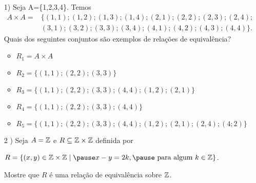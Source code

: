 \documentclass{beamer}
\begin{document}
    \begin{frame}
        \begin{exemplos}
            \begin{itemize}
                \item[1)] Seja A=\{1,2,3,4\}. Temos
                \begin{align*}
                    A\times A = &\{(1,1);(1,2);(1,3);(1,4);(2,1);(2,2);(2,3);(2,4);\\ &(3,1);(3,2);(3,3);(3,4);(4,1);(4,2);(4,3);(4,4)\}.
                \end{align*}
                Quais dos seguintes conjuntos s\~ao exemplos de rela{\c c}{\~o}es de equival{\^e}ncia?
                \begin{itemize}
                    \item $R_{1}= A\times A$\pause
                    \item $R_{2}=\{(1,1);(2,2);(3,3)\}$\pause
                    \item $R_{3}=\{(1,1);(2,2);(3,3);(4,4);(1,2);(2,1)\}$\pause
                    \item $R_{4}=\{(1,1);(2,2);(3,3);(4,4)\}$\pause
                    \item $R_{5}=\{(1,1);(2,2);(3,3);(4,4);(1,2);(2,1);(2,4);(4;2)\}$\pause
                \end{itemize}
            \end{itemize}
        \end{exemplos}
    \end{frame}
    \begin{frame}
    \end{frame}
    \begin{frame}
        \begin{exemplos}
            \begin{itemize}[label={\arabic*})]                
                \item[2
                )] Seja $A = \mathbb{Z}$ \pause e $R\subseteq \mathbb{Z}\times \mathbb{Z}$ \pause definida por
                \begin{center}
                    $R = \{(x,y)\in \z \times \z \mid \pause x - y = 2k, \pause \mbox{ para algum } k \in \z\}$.\pause
                \end{center}
                 Mostre que $R$ \'e uma rela{\c c}{\~a}o de equival{\^e}ncia sobre $\mathbb{Z}$.\pause
            \end{itemize}
        \end{exemplos}
        \vspace{3cm}
    \end{frame}
\end{document}
